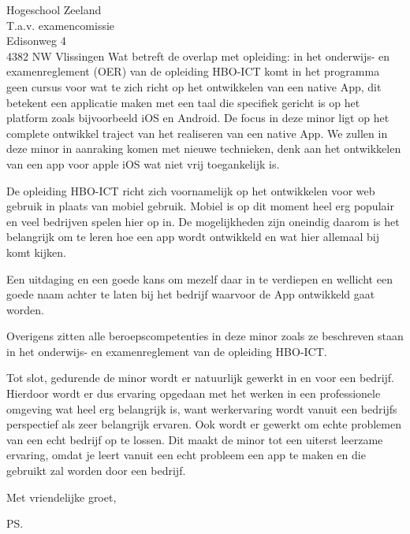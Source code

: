 \documentclass{letter}
\begin{document}
\begin{letter}{Hogeschool Zeeland \\ T.a.v. examencomissie \\ Edisonweg 4 \\ 4382 NW Vlissingen}
Wat betreft de overlap met opleiding: in het onderwijs- en examenreglement (OER) van de opleiding HBO-ICT komt in het programma geen cursus voor wat te zich richt op het ontwikkelen van een native App, dit betekent een applicatie maken met een taal die specifiek gericht is op het platform zoals bijvoorbeeld iOS en Android. De focus in deze minor ligt op het complete ontwikkel traject van het realiseren van een native App. We zullen in deze minor in aanraking komen met nieuwe technieken, denk aan het ontwikkelen van een app voor apple iOS wat niet vrij toegankelijk is. 

\newline

De opleiding HBO-ICT richt zich voornamelijk op het ontwikkelen voor web gebruik in plaats van mobiel gebruik. Mobiel is op dit moment heel erg populair en veel bedrijven spelen hier op in. 
De mogelijkheden zijn oneindig daarom is het belangrijk om te leren hoe een app wordt ontwikkeld en wat hier allemaal bij komt kijken.

\newline

Een uitdaging en een goede kans om mezelf daar in te verdiepen en wellicht een goede naam achter te laten bij het bedrijf waarvoor de App ontwikkeld gaat worden. 

\newline

Overigens zitten alle beroepscompetenties in deze minor zoals ze beschreven staan in het onderwijs- en examenreglement van de opleiding HBO-ICT.

\newline

Tot slot, gedurende de minor wordt er natuurlijk gewerkt in en voor een bedrijf. Hierdoor wordt er dus ervaring opgedaan met het werken in een professionele omgeving wat heel erg belangrijk is, want werkervaring wordt vanuit een bedrijfs perspectief als zeer belangrijk ervaren. Ook wordt er gewerkt om echte problemen van een echt bedrijf op te lossen. Dit maakt de minor tot een uiterst leerzame ervaring, omdat je leert vanuit een echt probleem een app te maken en die gebruikt zal worden door een bedrijf.


\closing{Met vriendelijke groet, }
\ps

\end{letter}
\end{document}
